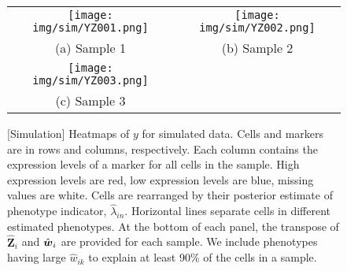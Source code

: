 \documentclass[12pt,]{article}
\def\beginmyfig{\begin{figure}[H]\center}
\def\endmyfig{\end{figure}}
\def\Z{\bm{Z}}
\newcommand{\true}{{\mbox{\tiny TR}}}
\newcommand{\bZ}{\mbox{\boldmath $Z$}}
\newcommand{\bw}{\mbox{\boldmath $w$}}
\def\beginmyfig{\begin{figure}[H]\center}
\def\endmyfig{\end{figure}}
\begin{document}
\begin{figure}%
  \begin{center}
  \begin{tabular}{cc}
  \texttt{[image: img/sim/YZ001.png]}&
  \texttt{[image: img/sim/YZ002.png]}\\
  (a) Sample 1 & (b) Sample 2\\
  \texttt{[image: img/sim/YZ003.png]}&\\
  (c) Sample 3 & \\
  \end{tabular}
  \end{center}
  \vspace{-0.05in}
  \caption{[Simulation]  Heatmaps of $y$ for simulated data. Cells and markers
  are in rows and columns, respectively. Each column contains the expression
  levels of a marker for all cells in the sample. High expression levels are
  red, low expression levels are blue, missing values are white.   Cells are
  rearranged by their posterior estimate of phenotype indicator,
  $\hat{\lambda}_{in}$.   Horizontal lines separate cells in different
  estimated phenotypes.  At the bottom of each panel, the transpose of
  $\hat{\Z}_i$ and $\hat{\bw}_i$ are provided for each sample. We include
  phenotypes having large $\hat{w}_{ik}$ to explain at least 90\% of the cells
  in a sample.
}
\label{fig:sim-post-Z}
\end{figure}






\end{document}
